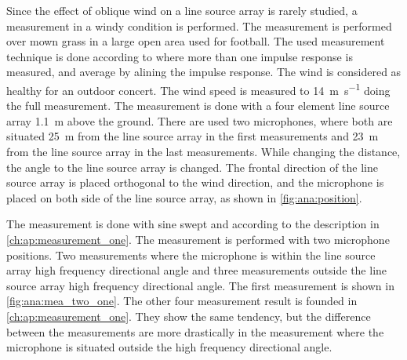 Since the effect of oblique wind on a line source array is rarely studied, a measurement in a windy condition is performed. The measurement is performed over mown grass in a large open area used for football. The used measurement technique is done according to \citep{gunness2001loudspeaker} where more than one impulse response is measured, and average by alining the impulse response. The wind is considered as healthy for an outdoor concert. The wind speed is measured to  \SI{14}{\meter\per\second} doing the full measurement. The measurement is done with a four element line source array \SI{1.1}{\meter} above the ground. There are used two microphones, where both are situated \SI{25}{\meter} from the line source array in the first measurements and \SI{23}{\meter} from the line source array in the last measurements. While changing the distance, the angle to the line source array is changed.  The frontal direction of the line source array is placed orthogonal to the wind direction, and the microphone is placed on both side of the line source array, as shown in \autoref{fig:ana:position}.



The measurement is done with sine swept and according to the description in \autoref{ch:ap:measurement_one}. The measurement is performed with two microphone positions. Two measurements where the microphone is within the line source array high frequency directional angle and three measurements outside the line source array high frequency directional angle. The first measurement is shown in \autoref{fig:ana:mea_two_one}. The other four measurement result is founded in \autoref{ch:ap:measurement_one}. They show the same tendency, but the difference between the measurements are more drastically in the measurement where the microphone is situated outside the high frequency directional angle. 



